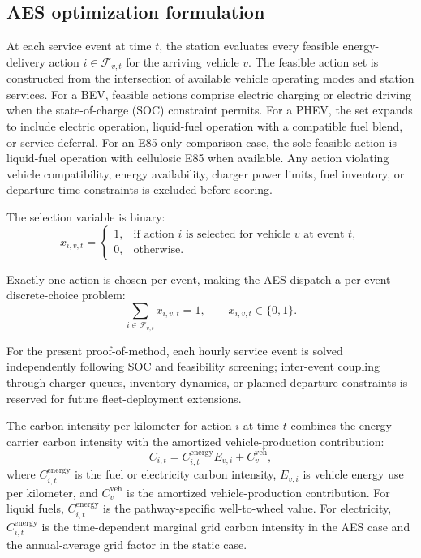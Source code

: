 \documentclass[cleantechnol,article,submit,pdftex,moreauthors]{Definitions/mdpi}
\begin{document}
\subsection{AES optimization formulation}
\label{subsec:optimization}

At each service event at time $t$, the station evaluates every feasible energy-delivery action $i \in \mathcal{F}_{v,t}$ for the arriving vehicle $v$. The feasible action set is constructed from the intersection of available vehicle operating modes and station services. For a BEV, feasible actions comprise electric charging or electric driving when the state-of-charge (SOC) constraint permits. For a PHEV, the set expands to include electric operation, liquid-fuel operation with a compatible fuel blend, or service deferral. For an E85-only comparison case, the sole feasible action is liquid-fuel operation with cellulosic E85 when available. Any action violating vehicle compatibility, energy availability, charger power limits, fuel inventory, or departure-time constraints is excluded before scoring.

The selection variable is binary:
\begin{equation}
	x_{i,v,t}=\begin{cases}
		1, & \text{if action } i \text{ is selected for vehicle } v \text{ at event } t,\\
		0, & \text{otherwise.}
	\end{cases}
	\label{eq:decision_variable}
\end{equation}

Exactly one action is chosen per event, making the AES dispatch a per-event discrete-choice problem:
\begin{equation}
	\sum_{i\in\mathcal{F}_{v,t}}x_{i,v,t}=1,\qquad x_{i,v,t}\in\{0,1\}.
	\label{eq:one_action}
\end{equation}

For the present proof-of-method, each hourly service event is solved independently following SOC and feasibility screening; inter-event coupling through charger queues, inventory dynamics, or planned departure constraints is reserved for future fleet-deployment extensions.

The carbon intensity per kilometer for action $i$ at time $t$ combines the energy-carrier carbon intensity with the amortized vehicle-production contribution:
\begin{equation}
	C_{i,t} = C^{\mathrm{energy}}_{i,t} E_{v,i} + C^{\mathrm{veh}}_v,
	\label{eq:carbon}
\end{equation}
where $C^{\mathrm{energy}}_{i,t}$ is the fuel or electricity carbon intensity, $E_{v,i}$ is vehicle energy use per kilometer, and $C^{\mathrm{veh}}_v$ is the amortized vehicle-production contribution. For liquid fuels, $C^{\mathrm{energy}}_{i,t}$ is the pathway-specific well-to-wheel value. For electricity, $C^{\mathrm{energy}}_{i,t}$ is the time-dependent marginal grid carbon intensity in the AES case and the annual-average grid factor in the static case.
\end{document}
